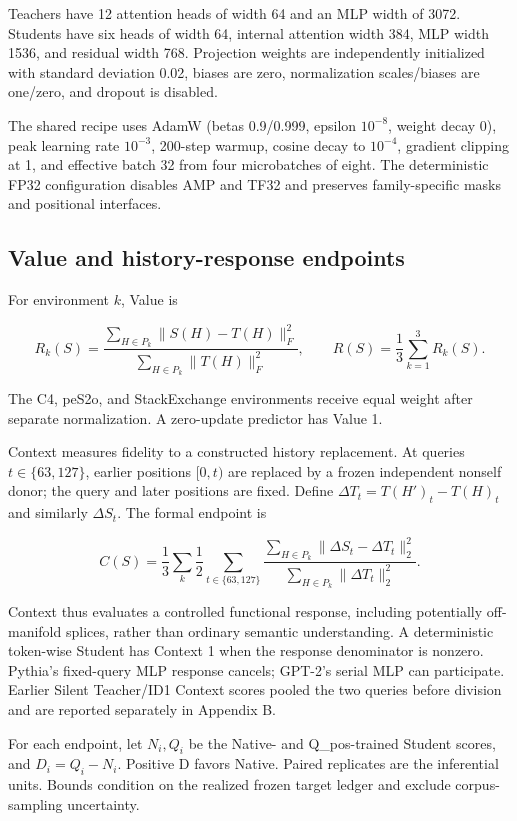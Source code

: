 Teachers have 12 attention heads of width 64 and an MLP width of 3072. Students have six heads of width 64, internal attention width 384, MLP width 1536, and residual width 768. Projection weights are independently initialized with standard deviation 0.02, biases are zero, normalization scales/biases are one/zero, and dropout is disabled.

The shared recipe uses AdamW (betas 0.9/0.999, epsilon \(10^{-8}\), weight decay 0), peak learning rate \(10^{-3}\), 200-step warmup, cosine decay to \(10^{-4}\), gradient clipping at 1, and effective batch 32 from four microbatches of eight. The deterministic FP32 configuration disables AMP and TF32 and preserves family-specific masks and positional interfaces.

\subsection{Value and history-response endpoints}\label{value-and-history-response-endpoints}

For environment \(k\), Value is

\[R_k(S)=\frac{\sum_{H\in P_k}\|S(H)-T(H)\|_F^2}
{\sum_{H\in P_k}\|T(H)\|_F^2},\qquad R(S)=\frac13\sum_{k=1}^{3}R_k(S).\]

The C4, peS2o, and StackExchange environments receive equal weight after separate normalization. A zero-update predictor has Value 1.

Context measures fidelity to a constructed history replacement. At queries \(t\in\{63,127\}\), earlier positions \([0,t)\) are replaced by a frozen independent nonself donor; the query and later positions are fixed. Define \(\Delta T_t=T(H')_t-T(H)_t\) and similarly \(\Delta S_t\). The formal endpoint is

\[C(S)=\frac13\sum_k\frac12\sum_{t\in\{63,127\}}
\frac{\sum_{H\in P_k}\|\Delta S_t-\Delta T_t\|_2^2}
{\sum_{H\in P_k}\|\Delta T_t\|_2^2}.\]

Context thus evaluates a controlled functional response, including potentially off-manifold splices, rather than ordinary semantic understanding. A deterministic token-wise Student has Context 1 when the response denominator is nonzero. Pythia's fixed-query MLP response cancels; GPT-2's serial MLP can participate. Earlier Silent Teacher/ID1 Context scores pooled the two queries before division and are reported separately in Appendix B.

For each endpoint, let \(N_i,Q_i\) be the Native- and Q\_pos-trained Student scores, and \(D_i=Q_i-N_i\). Positive D favors Native. Paired replicates are the inferential units. Bounds condition on the realized frozen target ledger and exclude corpus-sampling uncertainty.

